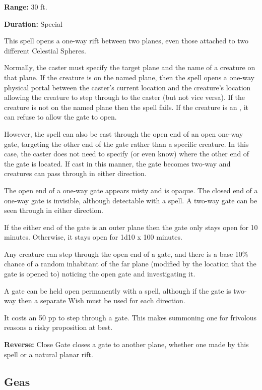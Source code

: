 \begin{multicols*}{2}
{\textbf{Range:} 30 ft.

\textbf{Duration:} Special}

This spell opens a one-way rift between two planes, even those attached to two different Celestial Spheres.

Normally, the caster must specify the target plane and the name of a creature on that plane. If the creature is on the named plane, then the spell opens a one-way physical portal between the caster’s current location and the creature’s location allowing the creature to step through to the caster (but not vice versa). If the creature is not on the named plane then the spell fails. If the creature is an , it can refuse to allow the gate to open.

However, the spell can also be cast through the open end of an open one-way gate, targeting the other end of the gate rather than a specific creature. In this case, the caster does not need to specify (or even know) where the other end of the gate is located. If cast in this manner, the gate becomes two-way and creatures can pass through in either direction.

The open end of a one-way gate appears misty and is opaque. The closed end of a one-way gate is invisible, although detectable with a  spell. A two-way gate can be seen through in either direction.

If the either end of the gate is an outer plane then the gate only stays open for 10 minutes. Otherwise, it stays open for 1d10 x 100 minutes.

Any creature can step through the open end of a gate, and there is a base 10\% chance of a random inhabitant of the far plane (modified by the location that the gate is opened to) noticing the open gate and investigating it.

A gate can be held open permanently with a  spell, although if the gate is two-way then a separate Wish must be used for each direction.

It costs an  50 pp to step through a gate. This makes summoning one for frivolous reasons a risky proposition at best.

\textbf{Reverse:} \hypertarget{spell:Close Gate}{Close Gate} closes a gate to another plane, whether one made by this spell or a natural planar rift.

\subsection{Geas}\label{spell:Geas}
\end{multicols*}
